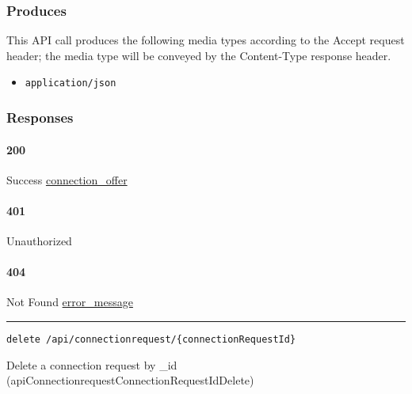 \hypertarget{produces-108}{%
\subsubsection{Produces}\label{produces-108}}

This API call produces the following media types according to the
{Accept} request header; the media type will be conveyed by the
{Content-Type} response header.

\begin{itemize}
\tightlist
\item
  \texttt{application/json}
\end{itemize}

\hypertarget{responses-111}{%
\subsubsection{Responses}\label{responses-111}}

\hypertarget{section-363}{%
\paragraph{200}\label{section-363}}

Success \protect\hyperlink{connection_offer}{connection\_offer}

\hypertarget{section-364}{%
\paragraph{401}\label{section-364}}

Unauthorized \protect\hyperlink{}{}

\hypertarget{section-365}{%
\paragraph{404}\label{section-365}}

Not Found \protect\hyperlink{error_message}{error\_message}

\begin{center}\rule{0.5\linewidth}{\linethickness}\end{center}

\protect\hypertarget{apiConnectionrequestConnectionRequestIdDelete}{}{}

\begin{verbatim}
delete /api/connectionrequest/{connectionRequestId}
\end{verbatim}

Delete a connection request by \_id
({apiConnectionrequestConnectionRequestIdDelete})

